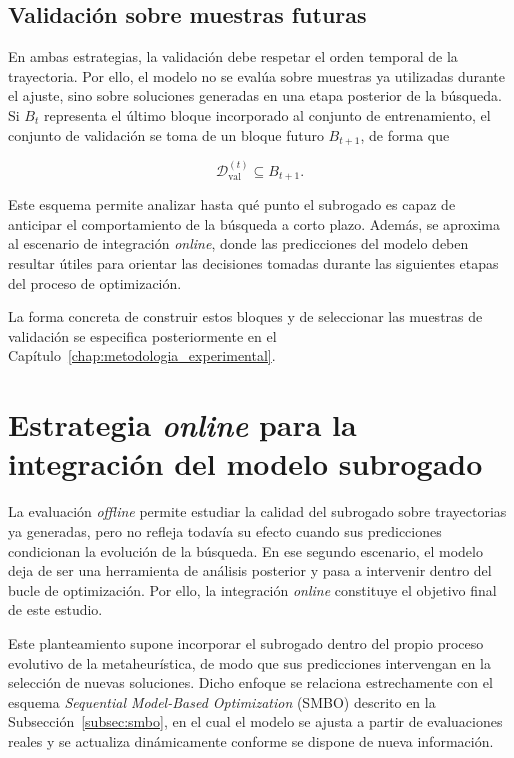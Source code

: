 \subsection{Validación sobre muestras futuras}

En ambas estrategias, la validación debe respetar el orden temporal de la
trayectoria. Por ello, el modelo no se evalúa sobre muestras ya utilizadas
durante el ajuste, sino sobre soluciones generadas en una etapa posterior de la búsqueda. Si \(B_t\) representa el último bloque incorporado al conjunto de entrenamiento, el conjunto de validación se toma de un bloque futuro \(B_{t+1}\), de forma que

\begin{equation}
    \mathcal{D}_{\text{val}}^{(t)}
    \subseteq
    B_{t+1}.
\end{equation}

Este esquema permite analizar hasta qué punto el subrogado es capaz de
anticipar el comportamiento de la búsqueda a corto plazo. Además, se aproxima al escenario de integración \textit{online}, donde las predicciones del modelo deben resultar útiles para orientar las decisiones tomadas durante las siguientes etapas del proceso de optimización.

La forma concreta de construir estos bloques y de
seleccionar las muestras de validación se especifica posteriormente en el
Capítulo~\ref{chap:metodologia_experimental}.


\section{Estrategia \textit{online} para la integración del modelo subrogado}
\label{sec:estrategia_online_integracion_surrogate}


La evaluación \textit{offline} permite estudiar la calidad del subrogado sobre
trayectorias ya generadas, pero no refleja todavía su efecto cuando sus
predicciones condicionan la evolución de la búsqueda. En ese segundo escenario,
el modelo deja de ser una herramienta de análisis posterior y pasa a intervenir
dentro del bucle de optimización. Por ello, la integración \textit{online}
constituye el objetivo final de este estudio.

Este planteamiento supone incorporar el subrogado dentro del propio proceso
evolutivo de la metaheurística, de modo que sus predicciones intervengan en la
selección de nuevas soluciones. Dicho enfoque se relaciona estrechamente con el
esquema \textit{Sequential Model-Based Optimization} (SMBO) descrito en la
Subsección~\ref{subsec:smbo}, en el cual el modelo se ajusta a partir de
evaluaciones reales y se actualiza dinámicamente conforme se dispone de nueva
información.

